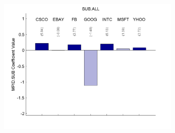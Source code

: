 \documentclass{article}
\begin{document}
\begin{figure}[htp!]
\begin{subfigure}{0.31\textwidth}
\end{subfigure}
\begin{subfigure}{0.31\textwidth}
\includegraphics[width=\linewidth]{docs/TMBR_Regression_Ratio_30sec_11_MPID_SUB_1MPIDLags_5DepVarLags.pdf}
\end{subfigure}



\end{figure}
\end{document}
